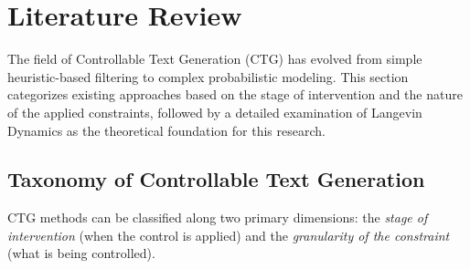 \documentclass[11pt]{article}
\begin{document}


\section{Literature Review}


The field of Controllable Text Generation (CTG) has evolved from simple heuristic-based filtering to complex probabilistic modeling. This section categorizes existing approaches based on the stage of intervention and the nature of the applied constraints, followed by a detailed examination of Langevin Dynamics as the theoretical foundation for this research.

\subsection{Taxonomy of Controllable Text Generation}

CTG methods can be classified along two primary dimensions: the \emph{stage of intervention} (when the control is applied) and the \emph{granularity of the constraint} (what is being controlled).
\end{document}
